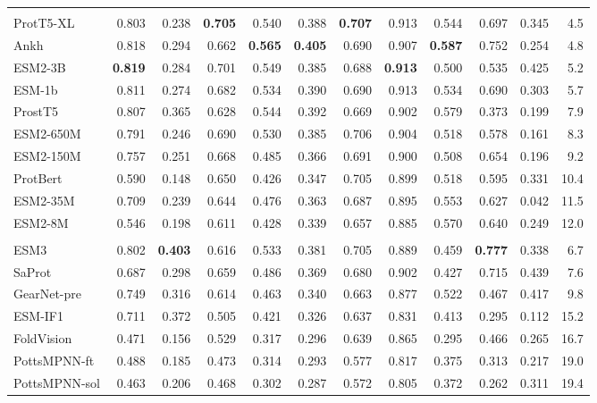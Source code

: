 \begin{longtable}{lrrrrrrrrrrr}
\rowcolor{CompassApricot!35}
\multicolumn{12}{l}{\textit{Measured to read sequence only (10 encoders)}} \\*
ProtT5-XL & 0.803 & 0.238 & \textbf{0.705} & 0.540 & 0.388 & \textbf{0.707} & 0.913 & 0.544 & 0.697 & 0.345 & 4.5 \\
Ankh & 0.818 & 0.294 & 0.662 & \textbf{0.565} & \textbf{0.405} & 0.690 & 0.907 & \textbf{0.587} & 0.752 & 0.254 & 4.8 \\
ESM2-3B & \textbf{0.819} & 0.284 & 0.701 & 0.549 & 0.385 & 0.688 & \textbf{0.913} & 0.500 & 0.535 & 0.425 & 5.2 \\
ESM-1b & 0.811 & 0.274 & 0.682 & 0.534 & 0.390 & 0.690 & 0.913 & 0.534 & 0.690 & 0.303 & 5.7 \\
ProstT5 & 0.807 & 0.365 & 0.628 & 0.544 & 0.392 & 0.669 & 0.902 & 0.579 & 0.373 & 0.199 & 7.9 \\
ESM2-650M & 0.791 & 0.246 & 0.690 & 0.530 & 0.385 & 0.706 & 0.904 & 0.518 & 0.578 & 0.161 & 8.3 \\
ESM2-150M & 0.757 & 0.251 & 0.668 & 0.485 & 0.366 & 0.691 & 0.900 & 0.508 & 0.654 & 0.196 & 9.2 \\
ProtBert & 0.590 & 0.148 & 0.650 & 0.426 & 0.347 & 0.705 & 0.899 & 0.518 & 0.595 & 0.331 & 10.4 \\
ESM2-35M & 0.709 & 0.239 & 0.644 & 0.476 & 0.363 & 0.687 & 0.895 & 0.553 & 0.627 & 0.042 & 11.5 \\
ESM2-8M & 0.546 & 0.198 & 0.611 & 0.428 & 0.339 & 0.657 & 0.885 & 0.570 & 0.640 & 0.249 & 12.0 \\
\rowcolor{CompassApricot!35}
\multicolumn{12}{l}{\textit{Measured to read coordinates (24 encoders)}} \\*
ESM3 & 0.802 & \textbf{0.403} & 0.616 & 0.533 & 0.381 & 0.705 & 0.889 & 0.459 & \textbf{0.777} & 0.338 & 6.7 \\
SaProt & 0.687 & 0.298 & 0.659 & 0.486 & 0.369 & 0.680 & 0.902 & 0.427 & 0.715 & 0.439 & 7.6 \\
GearNet-pre & 0.749 & 0.316 & 0.614 & 0.463 & 0.340 & 0.663 & 0.877 & 0.522 & 0.467 & 0.417 & 9.8 \\
ESM-IF1 & 0.711 & 0.372 & 0.505 & 0.421 & 0.326 & 0.637 & 0.831 & 0.413 & 0.295 & 0.112 & 15.2 \\
FoldVision & 0.471 & 0.156 & 0.529 & 0.317 & 0.296 & 0.639 & 0.865 & 0.295 & 0.466 & 0.265 & 16.7 \\
PottsMPNN-ft & 0.488 & 0.185 & 0.473 & 0.314 & 0.293 & 0.577 & 0.817 & 0.375 & 0.313 & 0.217 & 19.0 \\
PottsMPNN-sol & 0.463 & 0.206 & 0.468 & 0.302 & 0.287 & 0.572 & 0.805 & 0.372 & 0.262 & 0.311 & 19.4 \\

\end{longtable}

